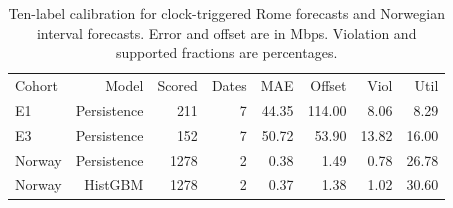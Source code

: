 \begin{table}[!ht]
\centering\small
\caption{Ten-label calibration for clock-triggered Rome forecasts and Norwegian interval forecasts. Error and offset are in Mbps. Violation and supported fractions are percentages.}
\begin{tabular}{lrrrrrrr}
\hline
Cohort & Model & Scored & Dates & MAE & Offset & Viol & Util \\
E1 & Persistence & 211 & 7 & 44.35 & 114.00 & 8.06 & 8.29 \\
E3 & Persistence & 152 & 7 & 50.72 & 53.90 & 13.82 & 16.00 \\
Norway & Persistence & 1278 & 2 & 0.38 & 1.49 & 0.78 & 26.78 \\
Norway & HistGBM & 1278 & 2 & 0.37 & 1.38 & 1.02 & 30.60 \\
\hline
\end{tabular}
\end{table}
